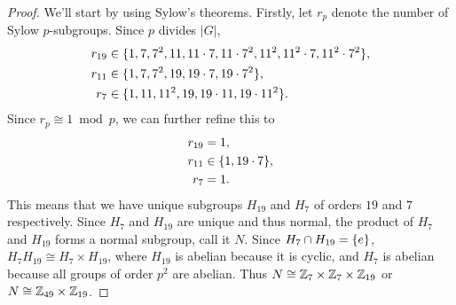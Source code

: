 \documentclass{article}
\begin{document}
\begin{proof}
  We'll start by using Sylow's theorems.
  Firstly, let $r_p$ denote the number of Sylow $p$-subgroups.
  Since $p$ divides $|G|$, \begin{align*}
    r_{19} &\in \{1, 7, 7^2, 11, 11\cdot7, 11\cdot7^2, 11^2, 11^2\cdot7,  11^2\cdot7^2\}, \\
    r_{11} &\in \{1, 7, 7^2, 19, 19\cdot7, 19\cdot7^2\}, \\
    r_7  &\in \{1, 11, 11^2, 19, 19\cdot11, 19\cdot11^2\}.
  \end{align*}
  Since $r_p \cong 1 \bmod p$, we can further refine this to \begin{align*}
    r_{19} &= 1, \\
    r_{11} &\in \{1, 19\cdot7\}, \\
    r_7  &= 1.
  \end{align*}
  This means that we have unique subgroups $H_{19}$ and $H_7$ of orders
  $19$ and $7$ respectively. Since $H_7$ and $H_{19}$ are unique and thus normal,
  the product of $H_7$ and $H_{19}$ forms a normal subgroup, call it $N$.
  Since $H_7 \cap H_{19} = \{e\}$, $H_7H_{19} \cong H_7 \times H_{19}$,
  where $H_{19}$ is abelian because it is cyclic, and $H_7$ is abelian because all
  groups of order $p^2$ are abelian. Thus
  $N \cong \mathbb Z_7 \times \mathbb Z_7 \times \mathbb Z_{19}$ or $N \cong \mathbb Z_{49} \times \mathbb Z_{19}$.


\end{proof}
\end{document}
